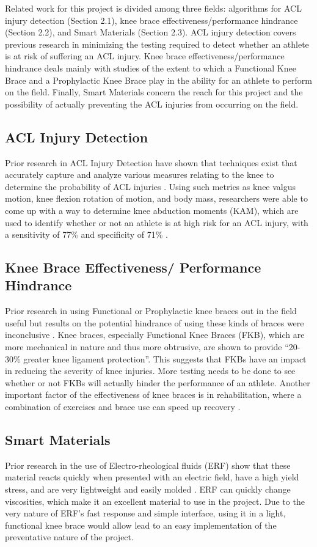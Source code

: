 Related work for this project is divided among three fields: algorithms for ACL injury detection (Section 2.1), knee brace effectiveness/performance hindrance (Section 2.2), and Smart Materials (Section 2.3). ACL injury detection covers previous research in minimizing the testing required to detect whether an athlete is at risk of suffering an ACL injury. Knee brace effectiveness/performance hindrance deals mainly with studies of the extent to which a Functional Knee Brace and a Prophylactic Knee Brace play in the ability for an athlete to perform on the field. Finally, Smart Materials concern the reach for this project and the possibility of actually preventing the ACL injuries from occurring on the field.

\subsection{ACL Injury Detection} Prior research in ACL Injury Detection have shown that techniques exist that accurately capture and analyze various measures relating to the knee to determine the probability of ACL injuries \cite{smedicine}. Using such metrics as knee valgus motion, knee flexion rotation of motion, and body mass, researchers were able to come up with a way to determine knee abduction moments (KAM), which are used to identify whether or not an athlete is at high risk for an ACL injury, with a sensitivity of 77\% and specificity of 71\% \cite{smedicine}\cite{Bahr01062005}. 

\subsection{Knee Brace Effectiveness/ Performance Hindrance} Prior research in using Functional or Prophylactic knee braces out in the field useful but results on the potential hindrance of using these kinds of braces were inconclusive \cite{Myer01042011}. Knee braces, especially Functional Knee Braces (FKB), which are more mechanical in nature and thus more obtrusive, are shown to provide “20-30\% greater knee ligament protection”. This suggests that FKBs have an impact in reducing the severity of knee injuries. More testing needs to be done to see whether or not FKBs will actually hinder the performance of an athlete. Another important factor of the effectiveness of knee braces is in rehabilitation, where a combination of exercises and brace use can speed up recovery \cite{hewett2010acl} .

\subsection{Smart Materials} Prior research in the use of Electro-rheological fluids (ERF) show that these material reacts quickly when presented with an electric field, have a high yield stress, and are very lightweight and easily molded \cite{smaterials}. ERF can quickly change viscosities, which make it an excellent material to use in the project. Due to the very nature of ERF’s fast response and simple interface, using it in a light, functional knee brace would allow lead to an easy implementation of the preventative nature of the project.